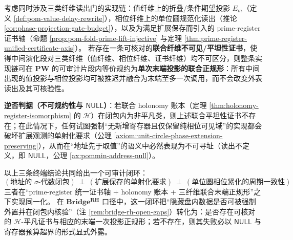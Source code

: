 \begin{theorem}\label{thm:trifiber-flatness-terminal-projection-normal-form}
考虑同时涉及三类纤维读出门的实现链：值纤维上的折叠/条件期望投影 \(E_m\)（定义 \ref{def:pom-value-delay-rewrite}），相位纤维上的单位圆规范化读出（推论 \ref{cor:phase-projection-gate-budget}），以及为满足扩展保存而引入的 prime-register 证书轴（命题 \ref{prop:pom-fold-prime-lift-injective} 与定理 \ref{thm:prime-register-unified-certificate-axis}）。
若存在一条可核对的\textbf{联合纤维不可见/平坦性证书}，使得中间演化段对三类纤维（值纤维、相位纤维、证书纤维）均不可区分，则整条实现链可在 \(\mathbf{PW}\) 的可审计片段内等价规约为\textbf{单次末端投影的联合正规形}：所有中间出现的值投影与相位投影均可被推迟并融合为末端至多一次调用，而不会改变外表读出及其可核验性。
\par
\textbf{逆否判据（不可规约性与 \(\mathsf{NULL}\)）}：若联合 holonomy 账本（定理 \ref{thm:holonomy-register-isomorphism} 的 \(\mathcal{H}\)）在闭包内为非平凡类，则上述联合平坦性证书不存在；在此情况下，任何试图强制“无新增寄存器且仅保留纯相位可见域”的实现都会破坏扩展观测的单射化要求（公理 \ref{axiom:unit-circle-phase-extension-preserving}），从而在“地址先于取值”的语义中必然表现为不可寻址（读出不定义，即 \(\mathsf{NULL}\)，公理 \ref{ax:pommin-address-null}）。
\end{theorem}

\begin{remark}\label{rem:bridge-rh-terminal-loop-summary}
以上三条终端结论共同给出一个可审计闭环：
\[
(\text{地址的 \(\sigma\)-代数闭包})
\ \perp\
(\text{扩展保存的单射化要求})
\ \perp\
(\text{单位圆相位紧化的周期一致性})
\]
三者在“prime-register 统一证书轴 + holonomy 账本 + 三纤维联合末端正规形”之下实现同一化。
在 \(\mathbf{Bridge^{RH}}\) 口径中，这一闭环把“隐藏盘内数据是否可被强制外置并在闭包内核验”（注 \ref{rem:bridge-rh-open-gaps}）转化为：是否存在可核对的 \(\mathcal{H}\)-平凡证书与相应的末端一次投影正规形；若不存在，则其失败必以 \(\mathsf{NULL}\) 与寄存器预算超界的形式显式外露。
\end{remark}


